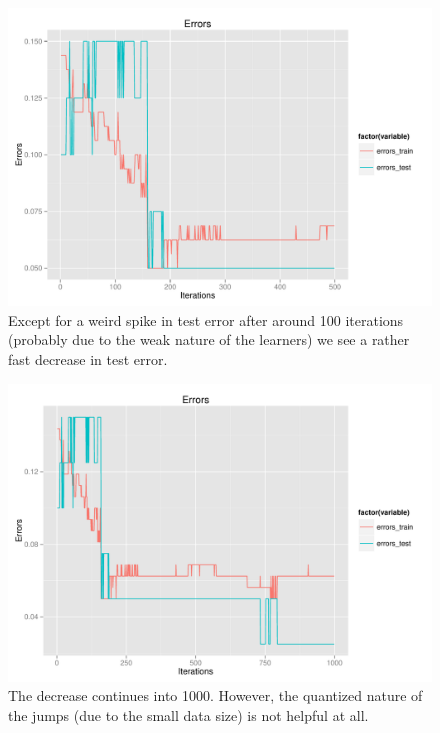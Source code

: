 \documentclass[11pt]{scrartcl}
\begin{document}
\begin{landscape}
\begin{figure}[H]
\centering\includegraphics[width=\textwidth]{./hw3/adaboost-500.pdf}
\caption{Except for a weird spike in test error after around 100 iterations (probably due to the weak nature of the learners) we see a rather fast decrease in test error.}
\end{figure}

\begin{figure}[H]
\centering\includegraphics[width=\textwidth]{./hw3/adaboost-1000.pdf}
\caption{The decrease continues into 1000. However, the quantized nature of the jumps (due to the small data size) is not helpful at all.}
\end{figure}
\end{landscape}
\end{document}
